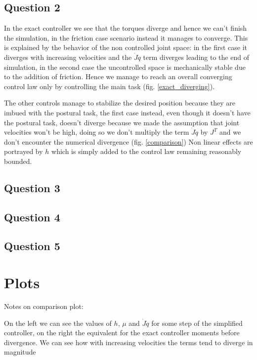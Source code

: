 \documentclass[10pt]{article}
\begin{document}
\subsection{Question 2}

In the exact controller we see that the torques diverge and hence we can't finish the simulation, in the friction case scenario instead it manages to converge. This is explained by the behavior of the non controlled joint space: in the first case it diverges with increasing velocities and the $\dot J \dot q$ term diverges leading to the end of simulation, in the second case the uncontrolled space is mechanically stable due to the addition of friction. Hence we manage to reach an overall converging control law only by controlling the main task (fig. \ref{exact_diverging}).

The other controls manage to stabilize the desired position because they are imbued with the postural task, the first case instead, even though it doesn't have the postural task, doesn't diverge because we made the assumption that joint velocities won't be high, doing so we don't multiply the term $\dot J \dot q$ by $J^T$ and we don't encounter the numerical divergence (fig. \ref{comparison}) Non linear effects are portrayed by $h$ which is simply added to the control law remaining reasonably bounded.
\subsection{Question 3}
\subsection{Question 4}
\subsection{Question 5}

\pagebreak

\section{Plots}

Notes on comparison plot:

On the left we can see the values of $h$, $\mu$ and $\dot J \dot q$ for some step of the simplified controller, on the right the equivalent for the exact controller moments before divergence. We can see how with increasing velocities the terms tend to diverge in magnitude
\end{document}
